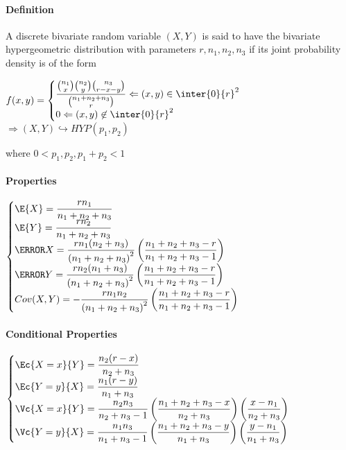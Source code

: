 \paragraph{Definition}
A discrete bivariate random variable $(X, Y )$ is said to have
the bivariate hypergeometric distribution with parameters $r, n_{1}, n_{2}, n_{3}$ if its joint probability density is of the
form
\begin{center}
	$f(x,y)=
	\begin{cases}	
		\dfrac{ {n_{1}\choose x}{n_{2}\choose y}{n_{3}\choose r-x-y}}{ {n_{1}+n_{2}+n_{3}\choose r}}\Leftarrow (x,y)\in\inter{0}{r}^{2}\\
		0\Leftarrow (x,y)\not\in\inter{0}{r}^{2} 
	\end{cases}$	
	$\Rightarrow \left( X,Y \right)\hookrightarrow HYP(p_{1},p_{2})
	$
\end{center}
where $0<p_{1},p_{2}, p_{1}+p_{2}<1$
\paragraph{Properties}
\begin{center}
	$
	\begin{cases}
		\E{X}=\dfrac{rn_{1}}{n_{1}+n_{2}+n_{3}}\\
		\E{Y}=\dfrac{rn_{2}}{n_{1}+n_{2}+n_{3}}\\
		\V{X}=\dfrac{rn_{1}(n_{2}+n_{3})}{\left(n_{1}+n_{2}+n_{3}\right)^{2}}\left(\dfrac{n_{1}+n_{2}+n_{3}-r}{n_{1}+n_{2}+n_{3}-1}\right)\\
	\V{Y}=\dfrac{rn_{2}(n_{1}+n_{3})}{\left(n_{1}+n_{2}+n_{3}\right)^{2}}\left(\dfrac{n_{1}+n_{2}+n_{3}-r}{n_{1}+n_{2}+n_{3}-1}\right)\\
	Cov(X,Y)=-\dfrac{rn_{1}n_{2}}{\left(n_{1}+n_{2}+n_{3}\right)^{2}}\left(\dfrac{n_{1}+n_{2}+n_{3}-r}{n_{1}+n_{2}+n_{3}-1}\right)\\
	\end{cases}
	$
\end{center}
\paragraph{Conditional Properties}
\begin{center}
	$
	\begin{cases}
		\Ec{X=x}{Y}=\dfrac{n_{2}(r-x)}{n_{2}+n_{3}}\\
	\Ec{Y=y}{X}=\dfrac{n_{1}(r-y)}{n_{1}+n_{3}}\\
	\Vc{X=x}{Y}=\dfrac{n_{2}n_{3}}{n_{2}+n_{3}-1}\left( \dfrac{n_{1}+n_{2}+n_{3}-x}{n_{2}+n_{3}} \right)\left( \dfrac{x-n_{1}}{n_{2}+n_{3}} \right)\\
	\Vc{Y=y}{X}=\dfrac{n_{1}n_{3}}{n_{1}+n_{3}-1}\left( \dfrac{n_{1}+n_{2}+n_{3}-y}{n_{1}+n_{3}} \right)\left( \dfrac{y-n_{1}}{n_{1}+n_{3}} \right)
	\end{cases}
	$
\end{center}
